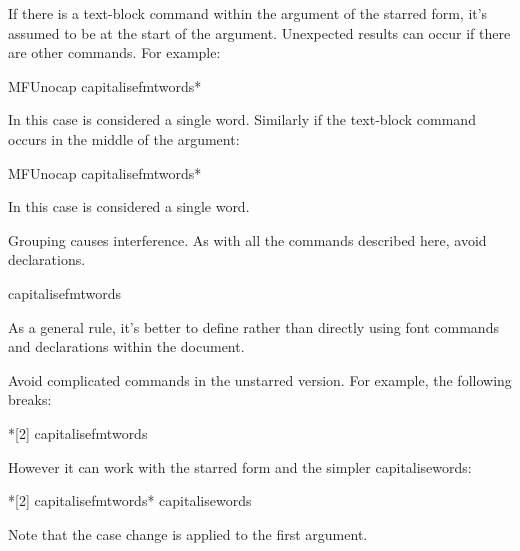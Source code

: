 \documentclass[titlepage=false,oneside,
 fontsize=12pt,captions=tableheading]{scrbook}
\begin{document}
If there is a text-block command within the argument of the
starred form, it's assumed to be at the start of the argument.
Unexpected results can occur if there are other commands.
For example:
\begin{badcodebox}
\gls{MFUnocap}
\gls{capitalisefmtwords}*
\end{badcodebox}
\begin{resultbox}
\end{resultbox}
In this case  is considered a
single word. Similarly if the text-block command occurs
in the middle of the argument:
\begin{badcodebox}
\gls{MFUnocap}
\gls{capitalisefmtwords}*
\end{badcodebox}
\begin{resultbox}
\end{resultbox}
In this case  is considered a
single word.

Grouping causes interference.
As with all the commands described here, avoid declarations.
\begin{badcodebox}
\gls{capitalisefmtwords}
\end{badcodebox}

\begin{information}
As a general rule, it's better to define  rather
than directly using font commands and declarations within the
document.
\end{information}

Avoid complicated commands in the unstarred version. For example,
the following breaks:
\begin{badcodebox}
*[2]
\gls{capitalisefmtwords}
\end{badcodebox}
However it can work with the starred form and the simpler
\gls{capitalisewords}:
\begin{codebox}
*[2]
\gls{capitalisefmtwords}*
\codepar
\gls{capitalisewords}
\end{codebox}
\begin{resultbox}
\newcommand*{\swap}[2]{{#2}{#1}}
\capitalisefmtwords*{a \swap{bo}{ok} of rhyme}

\capitalisewords{a \swap{bo}{ok} of rhyme}
\end{resultbox}
Note that the case change is applied to the first argument.
\end{document}
